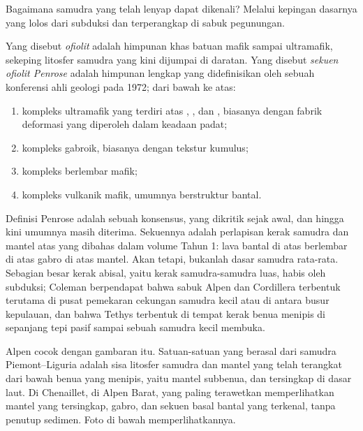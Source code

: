 Bagaimana samudra yang telah lenyap dapat dikenali? Melalui kepingan dasarnya yang lolos dari
subduksi dan terperangkap di sabuk pegunungan.

\begin{definition}\label{def:b2:alpine-orogen:ophiolite}
Yang disebut \emph{ofiolit} adalah himpunan khas batuan mafik sampai ultramafik,
sekeping litosfer samudra yang kini dijumpai di daratan. Yang disebut \emph{sekuen ofiolit
Penrose} adalah himpunan lengkap yang didefinisikan oleh sebuah
konferensi ahli geologi pada 1972; dari bawah ke atas:
\begin{enumerate}
\item kompleks ultramafik yang terdiri atas , , dan , biasanya dengan
fabrik deformasi yang diperoleh dalam keadaan padat;
\item kompleks gabroik, biasanya dengan tekstur kumulus;
\item kompleks  berlembar mafik;
\item kompleks vulkanik mafik, umumnya berstruktur bantal.
\end{enumerate}
\end{definition}

Definisi Penrose adalah sebuah konsensus, yang dikritik sejak awal, dan hingga kini umumnya masih
diterima. Sekuennya adalah perlapisan kerak samudra dan mantel atas yang dibahas dalam volume
Tahun 1: lava bantal di atas  berlembar di atas gabro di atas mantel. Akan tetapi,  bukanlah
dasar samudra rata-rata. Sebagian besar kerak abisal, yaitu kerak samudra-samudra luas, habis oleh
subduksi; Coleman berpendapat bahwa  sabuk Alpen dan Cordillera terbentuk
terutama di pusat pemekaran cekungan samudra kecil atau di antara busur kepulauan, dan bahwa
 Tethys terbentuk di tempat kerak benua menipis di sepanjang tepi pasif sampai sebuah samudra
kecil membuka.

 Alpen cocok dengan gambaran itu. Satuan-satuan yang berasal dari samudra Piemont--Liguria
adalah sisa litosfer samudra dan mantel yang telah terangkat dari bawah benua
yang menipis, yaitu mantel subbenua, dan tersingkap di dasar laut. Di
Chenaillet, di Alpen Barat,  yang paling terawetkan memperlihatkan mantel yang tersingkap,
gabro, dan sekuen basal bantal yang terkenal, tanpa penutup sedimen.
Foto di bawah memperlihatkannya.


